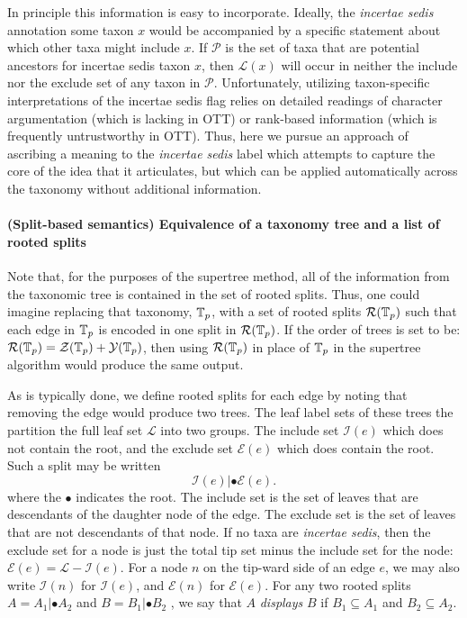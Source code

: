 \documentclass[english]{article}
\begin{document}
In principle this information is easy to incorporate.
Ideally, the \emph{incertae sedis}
annotation some taxon $x$ would be accompanied by a specific
statement about which other taxa might include $x$.
If $\mathcal{P}$ is the set of taxa that are potential ancestors for
incertae sedis taxon $x$, then $\mathcal{L}(x)$ will occur in neither
the include nor the exclude set of any taxon in $\mathcal{P}$.
Unfortunately, utilizing taxon-specific interpretations of the
incertae sedis flag relies on detailed readings of character argumentation
(which is lacking in OTT) or rank-based information (which is frequently
untrustworthy in OTT).
Thus, here we pursue an approach of ascribing a
meaning to the \emph{incertae sedis} label which attempts to capture
the core of the idea that it articulates, but which can be applied
automatically across the taxonomy without additional information.

\paragraph{(Split-based semantics) Equivalence of a taxonomy tree and a list of rooted splits}

Note that, for the purposes of the supertree method, all of the information from
the taxonomic tree is contained in the set of rooted splits. Thus, one could
imagine replacing that taxonomy, $\mbox{\ensuremath{\mathbb{T}}}_{p}$, with a set of rooted splits $\mathcal{R}(\mbox{\ensuremath{\mathbb{T}}}_{p})$ such that
each edge in $\mbox{\ensuremath{\mathbb{T}}}_{p}$ is encoded in one split in $\mathcal{R}(\mbox{\ensuremath{\mathbb{T}}}_{p})$. If the order of trees is set
to be: $\mathcal{R}(\mbox{\ensuremath{\mathbb{T}}}_{p})=\mathcal{Z}(\mbox{\ensuremath{\mathbb{T}}}_{p}) + 
\mathcal{Y}(\mbox{\ensuremath{\mathbb{T}}}_{p})$, then using $\mathcal{R}(\mbox{\ensuremath{\mathbb{T}}}_{p})$ in place of $\mbox{\ensuremath{\mathbb{T}}}_{p}$ in the supertree
algorithm would produce the same output.

As is typically done, we define rooted splits for each edge by noting that
removing the edge would produce two trees. The leaf label sets of these trees
the partition the full leaf set $\mathcal{L}$ into two groups. The include set $\mathcal{I}(e)$ which
does not contain the root, and the exclude set $\mathcal{E}(e)$ which does contain the root.
Such a split may be written
\[ \mathcal{I}(e)|\bullet\mathcal{E}(e).\]
where the $\bullet$ indicates the root. The include set is the set of leaves that are
descendants of the daughter node of the edge. The exclude set is the set of
leaves that are not descendants of that node. If no taxa are \emph{incertae sedis},
then the exclude set for a node is just the total tip set minus the include set
for the node: $\mathcal{E}(e)  =\mathcal{L}-\mathcal{I}(e)$. For a node $n$ on the tip-ward side of an edge $e$, we
may also write $\mathcal{I}(n)$ for $\mathcal{I}(e)$, and $\mathcal{E}(n)$ for $\mathcal{E}(e)$. For any two rooted splits $A=A_{1}|\bullet A_{2}$
and $B=B_{1}|\bullet B_{2}$ , we say that $A$ \emph{displays }$B$ if $B_{1}\subseteq A_{1}$ and $B_{2}\subseteq A_{2}$.
\end{document}
